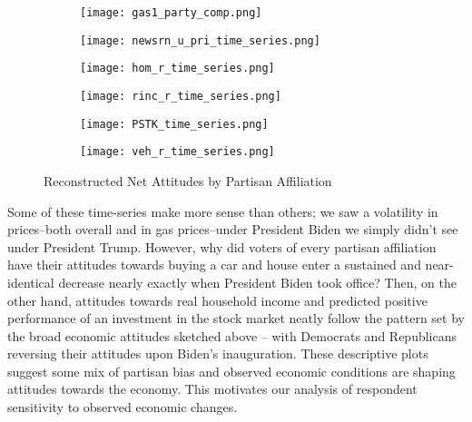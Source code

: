 \documentclass{article}
\begin{document}
\begin{figure}[ht!]
  \centering
  \begin{subfigure}[b]{0.49\textwidth}
    \centering
    \texttt{[image: gas1\_party\_comp.png]}
    \label{fig:gas1_time_series}
  \end{subfigure}
  \begin{subfigure}[b]{0.49\textwidth}
    \centering
    \texttt{[image: newsrn\_u\_pri\_time\_series.png]}
    \label{fig:newsrn_u_pri_time_series}
  \end{subfigure}
   \begin{subfigure}[b]{0.49\textwidth}
    \centering
    \texttt{[image: hom\_r\_time\_series.png]}
    \label{fig:hom_time_series}
  \end{subfigure}
   \begin{subfigure}[b]{0.49\textwidth}
    \centering
    \texttt{[image: rinc\_r\_time\_series.png]}
    \label{fig:rinc_time_series}
  \end{subfigure}
   \begin{subfigure}[b]{0.49\textwidth}
    \centering
    \texttt{[image: PSTK\_time\_series.png]}
    \label{fig:pstk_time_series}
  \end{subfigure}
   \begin{subfigure}[b]{0.49\textwidth}
    \centering
    \texttt{[image: veh\_r\_time\_series.png]}
    \label{fig:veh_time_series}
  \end{subfigure}
  \caption{Reconstructed Net Attitudes by Partisan Affiliation}
  \label{fig:panel}
\end{figure}

Some of these time-series make more sense than others; we saw a volatility in prices--both overall and in gas prices--under President Biden we simply didn't see under President Trump. However, why did voters of every partisan affiliation have their attitudes towards buying a car and house enter a sustained and near-identical decrease nearly exactly when President Biden took office? Then, on the other hand, attitudes towards real household income and predicted positive performance of an investment in the stock market neatly follow the pattern set by the broad economic attitudes sketched above -- with Democrats and Republicans reversing their attitudes upon Biden's inauguration. These descriptive plots suggest some mix of partisan bias and observed economic conditions are shaping attitudes towards the economy. This motivates our  analysis of respondent sensitivity to observed economic changes.
\end{document}
